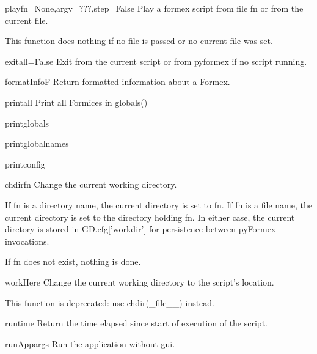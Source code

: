 \begin{funcdesc}{play}{fn=None,argv=???,step=False}
Play a formex script from file fn or from the current file.

    This function does nothing if no file is passed or no current
    file was set.
    

\end{funcdesc}


\begin{funcdesc}{exit}{all=False}
Exit from the current script or from pyformex if no script running.

\end{funcdesc}


\begin{funcdesc}{formatInfo}{F}
Return formatted information about a Formex.

\end{funcdesc}


\begin{funcdesc}{printall}{}
Print all Formices in globals()

\end{funcdesc}


\begin{funcdesc}{printglobals}{}


\end{funcdesc}


\begin{funcdesc}{printglobalnames}{}


\end{funcdesc}


\begin{funcdesc}{printconfig}{}


\end{funcdesc}


\begin{funcdesc}{chdir}{fn}
Change the current working directory.

    If fn is a directory name, the current directory is set to fn.
    If fn is a file name, the current directory is set to the directory
    holding fn.
    In either case, the current dirctory is stored in GD.cfg['workdir']
    for persistence between pyFormex invocations.
    
    If fn does not exist, nothing is done.
    

\end{funcdesc}


\begin{funcdesc}{workHere}{}
Change the current working directory to the script's location.

    This function is deprecated: use chdir(_file__) instead.
    

\end{funcdesc}


\begin{funcdesc}{runtime}{}
Return the time elapsed since start of execution of the script.

\end{funcdesc}


\begin{funcdesc}{runApp}{args}
Run the application without gui.

\end{funcdesc}



